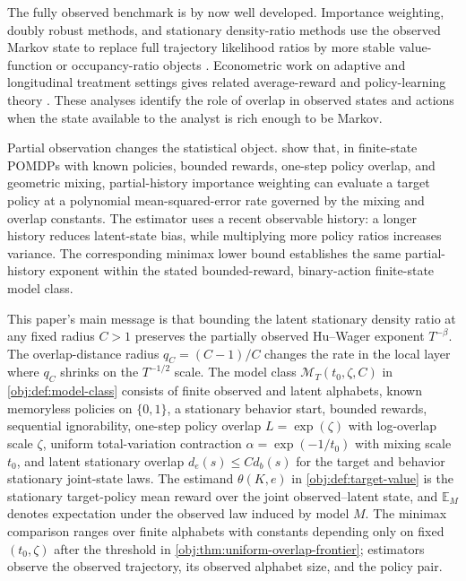 The fully observed benchmark is by now well developed. Importance weighting, doubly robust methods, and stationary density-ratio methods use the observed Markov state to replace full trajectory likelihood ratios by more stable value-function or occupancy-ratio objects \citep{Precup2000,Jiang2016,Thomas2016,Liu2018,Nachum2019,Uehara2020,KallusUehara2020}. Econometric work on adaptive and longitudinal treatment settings gives related average-reward and policy-learning theory \citep{LiaoKlasnjaMurphy2021,Liao2022}. These analyses identify the role of overlap in observed states and actions when the state available to the analyst is rich enough to be Markov.

Partial observation changes the statistical object. \citet{HuWager2023} show that, in finite-state POMDPs with known policies, bounded rewards, one-step policy overlap, and geometric mixing, partial-history importance weighting can evaluate a target policy at a polynomial mean-squared-error rate governed by the mixing and overlap constants. The estimator uses a recent observable history: a longer history reduces latent-state bias, while multiplying more policy ratios increases variance. The corresponding minimax lower bound establishes the same partial-history exponent within the stated bounded-reward, binary-action finite-state model class.

This paper's main message is that bounding the latent stationary density ratio at any fixed radius \(C>1\) preserves the partially observed Hu--Wager exponent \(T^{-\beta}\). The overlap-distance radius \(q_C=(C-1)/C\) changes the rate in the local layer where \(q_C\) shrinks on the \(T^{-1/2}\) scale. The model class \(\mathcal M_T(t_0,\zeta,C)\) in \cref{obj:def:model-class} consists of finite observed and latent alphabets, known memoryless policies on \(\{0,1\}\), a stationary behavior start, bounded rewards, sequential ignorability, one-step policy overlap \(L=\exp(\zeta)\) with log-overlap scale \(\zeta\), uniform total-variation contraction \(\alpha=\exp(-1/t_0)\) with mixing scale \(t_0\), and latent stationary overlap \(d_e(s)\le C d_b(s)\) for the target and behavior stationary joint-state laws. The estimand \(\theta(K,e)\) in \cref{obj:def:target-value} is the stationary target-policy mean reward over the joint observed--latent state, and \(\mathbb E_M\) denotes expectation under the observed law induced by model \(M\). The minimax comparison ranges over finite alphabets with constants depending only on fixed \((t_0,\zeta)\) after the threshold in \cref{obj:thm:uniform-overlap-frontier}; estimators observe the observed trajectory, its observed alphabet size, and the policy pair.

